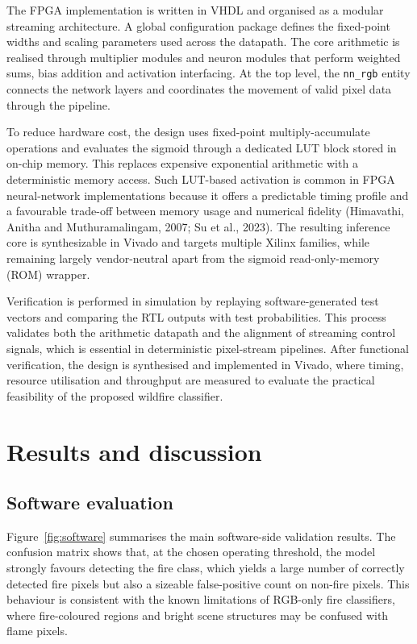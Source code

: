 \documentclass[11pt,a4paper]{article}
\begin{document}
The FPGA implementation is written in VHDL and organised as a modular streaming architecture. A global configuration package defines the fixed-point widths and scaling parameters used across the datapath. The core arithmetic is realised through multiplier modules and neuron modules that perform weighted sums, bias addition and activation interfacing. At the top level, the \texttt{nn\_rgb} entity connects the network layers and coordinates the movement of valid pixel data through the pipeline.

To reduce hardware cost, the design uses fixed-point multiply-accumulate operations and evaluates the sigmoid through a dedicated LUT block stored in on-chip memory. This replaces expensive exponential arithmetic with a deterministic memory access. Such LUT-based activation is common in FPGA neural-network implementations because it offers a predictable timing profile and a favourable trade-off between memory usage and numerical fidelity (Himavathi, Anitha and Muthuramalingam, 2007; Su et al., 2023). The resulting inference core is synthesizable in Vivado and targets multiple Xilinx families, while remaining largely vendor-neutral apart from the sigmoid read-only-memory (ROM) wrapper.

Verification is performed in simulation by replaying software-generated test vectors and comparing the RTL outputs with test probabilities. This process validates both the arithmetic datapath and the alignment of streaming control signals, which is essential in deterministic pixel-stream pipelines. After functional verification, the design is synthesised and implemented in Vivado, where timing, resource utilisation and throughput are measured to evaluate the practical feasibility of the proposed wildfire classifier.

\section{Results and discussion}

\subsection{Software evaluation}

Figure~\ref{fig:software} summarises the main software-side validation results. The confusion matrix shows that, at the chosen operating threshold, the model strongly favours detecting the fire class, which yields a large number of correctly detected fire pixels but also a sizeable false-positive count on non-fire pixels. This behaviour is consistent with the known limitations of RGB-only fire classifiers, where fire-coloured regions and bright scene structures may be confused with flame pixels.
\end{document}
